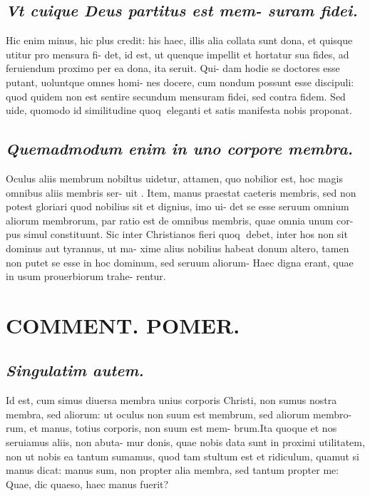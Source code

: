 \documentclass{article}
\begin{document}
\begin{pages}
\subsection*{\textit{Vt cuique Deus partitus est mem- suram fidei. }}\pstart Hic enim minus, hic plus credit: his haec, illis alia collata sunt dona, et quisque utitur pro mensura fi- det, id est, ut quenque impellit et hortatur sua fides, ad feruiendum proximo per ea dona, ita seruit. Qui- dam hodie se doctores esse putant, uoluntque omnes homi- nes docere, cum nondum possunt esse discipuli: quod quidem non est sentire secundum mensuram fidei, sed contra fidem. Sed uide, quomodo id similitudine quoq eleganti et satis manifesta nobis proponat.   \pend
{}
{}
\subsection*{\textit{ Quemadmodum enim in uno corpore membra. }}\pstart Oculus aliis membrum nobiltus uidetur, attamen, quo nobilior est, hoc magis omnibus aliis membris ser- uit . Item, manus praestat caeteris membris, sed non potest gloriari quod nobilius sit et dignius, imo ui- det se esse seruum omnium aliorum membrorum, par ratio est de omnibus membris, quae omnia unum cor- pus simul constituunt. Sic inter Christianos fieri quoq debet, inter hos non sit dominus aut tyrannus, ut ma- xime alius nobilius habeat donum altero, tamen non putet se esse in hoc dominum, sed seruum aliorum- Haec digna erant, quae in usum prouerbiorum trahe- rentur.   \pend
\section*{COMMENT. POMER.  }
{}
\subsection*{\textit{Singulatim autem. }}\pstart Id est, cum simus diuersa membra unius corporis Christi, non sumus nostra membra, sed aliorum: ut oculus non suum est membrum, sed aliorum membro- rum, et manus, totius corporis, non suum est mem- brum.Ita quoque et nos seruiamus aliis, non abuta- mur donis, quae nobis data sunt in proximi utilitatem, non ut nobis ea tantum sumamus, quod tam stultum est et ridiculum, quamut si manus dicat: manus sum, non propter alia membra, sed tantum propter me: Quae, dic quaeso, haec manus fuerit?  \pend
{}
{}

\end{pages}
\end{document}
